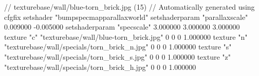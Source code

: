 // texturebase/wall/blue-torn_brick.jpg (15)
// Automatically generated using cfgfix
setshader "bumpspecmapparallaxworld"
setshaderparam "parallaxscale" 0.009000 -0.005000
setshaderparam "specscale" 3.000000 3.000000 3.000000
texture "c" "texturebase/wall/blue-torn_brick.jpg" 0 0 0 1.000000
texture "n" "texturebase/wall/specials/torn_brick_n.jpg" 0 0 0 1.000000
texture "s" "texturebase/wall/specials/torn_brick_s.jpg" 0 0 0 1.000000
texture "z" "texturebase/wall/specials/torn_brick_h.jpg" 0 0 0 1.000000
